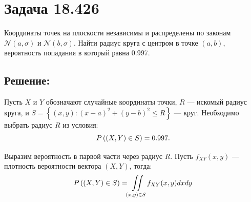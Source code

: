 \section*{Задача 18.426}

Координаты точек на плоскости независимы и распределены по законам $\mathcal{N} \left ( a, \sigma \right )$ и $\mathcal{N} \left ( b, \sigma \right )$. Найти радиус круга
с центром в точке $\left ( a, b \right )$, вероятность попадания в который равна 0.997.

\subsection*{Решение:}

Пусть $X$ и $Y$ обозначают случайные координаты точки, $R$ --- искомый радиус круга, и $S = \left \{ (x,y) : (x-a)^2 + (y-b)^2 \le R \right \}$ --- круг. Необходимо выбрать
радиус $R$ из условия:
\begin{equation}
    P \left ( \left ( X, Y \right ) \in S \right ) = 0.997.
\end{equation}

Выразим вероятность в парвой части через радиус $R$. Пусть $f_{XY}(x,y)$ --- плотность вероятности вектора $\left ( X, Y \right )$, тогда:
\begin{equation}
    P \left ( \left ( X, Y \right ) \in S \right ) = \iint \limits_{(x,y) \in S} f_{XY}(x,y) dx dy
\end{equation}

